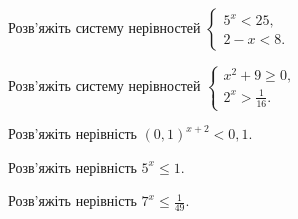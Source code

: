 \documentclass[12pt]{article}
\begin{document}
\begin{samepage}
\noindent\zadnum Розв'яжіть систему нерівностей $\begin{cases} 5^x < 25, \\ 2 - x < 8. \end{cases}$ 

\nmtnobreak
{}
\par{}
\end{samepage}

\begin{samepage}
\noindent\zadnum Розв'яжіть систему нерівностей $\begin{cases} x^2 + 9 \geqslant 0, \\ 2^x > \displaystyle\frac{1}{16}. \end{cases}$ 

\nmtnobreak
\answerTable{$[-3; +\infty)$}{$(-4; +\infty)$}{$(-4; -3]$}{$(-4; -3] \cup [3; +\infty)$}{$\varnothing$}
\par{}
\end{samepage}

\begin{samepage}
\noindent\zadnum Розв'яжіть нерівність $(0{,}1)^{x+2} < 0{,}1$. 

\nmtnobreak
{}
\par{}
\end{samepage}

\begin{samepage}
\noindent\zadnum Розв'яжіть нерівність $5^x \leqslant 1$. 

\nmtnobreak
\answerTableTall{$[1; +\infty)$}{$(-\infty; 1]$}{$\left(-\infty; \displaystyle\frac{1}{5}\right)$}{$(-\infty; 0]$}{$[0; +\infty)$}

\nmtnobreak
\par{}\vspace{0.25cm}
\end{samepage}

\begin{samepage}
\noindent\zadnum Розв'яжіть нерівність $7^x \leqslant \displaystyle\frac{1}{49}$. 

\nmtnobreak
\answerTableTall{$\left(-\infty; \displaystyle\frac{1}{243}\right]$}{$[-2; +\infty)$}{$\left[\displaystyle\frac{1}{7}; +\infty\right)$}{$(-\infty; -2]$}{$\left(-\infty; \displaystyle\frac{1}{2}\right]$}
\par{}
\end{samepage}
\end{document}
